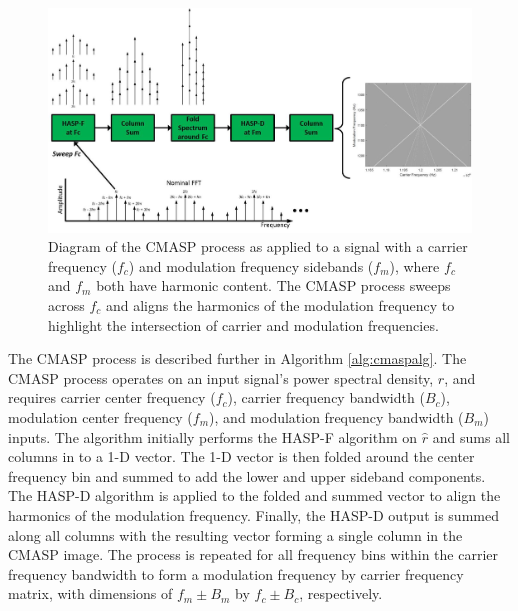 \begin{figure}[tp]
	\includegraphics[width=\textwidth]{./misc_graphics/cmasp_diagram.jpg}
	\centering
	\caption{Diagram of the CMASP process as applied to a signal with a carrier frequency ($f_c$) and modulation frequency sidebands ($f_m$), where $f_c$ and $f_m$ both have harmonic content.  The CMASP process sweeps across $f_c$ and aligns the harmonics of the modulation frequency to highlight the intersection of carrier and modulation frequencies.}
	\label{fig:cmasp_diagram}
\end{figure}

The CMASP process is described further in Algorithm \ref{alg:cmaspalg}.  The CMASP process operates on an input signal's power spectral density, $\hat{r}$, and requires carrier center frequency ($f_c$), carrier frequency bandwidth ($B_c$), modulation center frequency ($f_m$), and modulation frequency bandwidth ($B_m$) inputs.  The algorithm initially performs the HASP-F algorithm on $\hat{r}$ and sums all columns in to a 1-D vector.  The 1-D vector is then folded around the center frequency bin and summed to add the lower and upper sideband components.  The HASP-D algorithm is applied to the folded and summed vector to align the harmonics of the modulation frequency.  Finally, the HASP-D output is summed along all columns with the resulting vector forming a single column in the CMASP image.  The process is repeated for all frequency bins within the carrier frequency bandwidth to form a modulation frequency by carrier frequency matrix, with dimensions of $f_m \pm B_m$ by $f_c \pm B_c$, respectively. 


